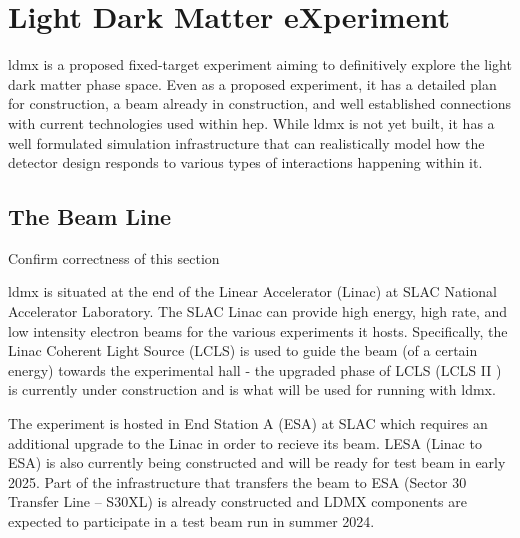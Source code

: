 \chapter{Light Dark Matter eXperiment}
\label{chapter:ldmx:experiment}

\ac{ldmx} is a proposed fixed-target experiment aiming to definitively explore
the light dark matter phase space. Even as a proposed experiment, it has a detailed
plan for construction, a beam already in construction, and well established connections
with current technologies used within \ac{hep}. While \ac{ldmx} is not yet built,
it has a well formulated simulation infrastructure that can realistically model
how the detector design responds to various types of interactions happening within it.

\section{The Beam Line}
\begin{todoenv}
  Confirm correctness of this section
\end{todoenv}
\ac{ldmx} is situated at the end of the Linear Accelerator (Linac) at SLAC National Accelerator
Laboratory. The SLAC Linac can provide high energy, high rate, and low intensity electron beams for
the various experiments it hosts. Specifically, the Linac Coherent Light Source (LCLS) is
used to guide the beam (of a certain energy) towards the experimental hall - the upgraded
phase of LCLS (LCLS II \cite{lcls-ii}) is currently under construction and is what will
be used for running with \ac{ldmx}.

The experiment is hosted in End Station A (ESA) at SLAC which requires an additional upgrade to the
Linac in order to recieve its beam. LESA (Linac to ESA) \cite{lesa-design} is also currently being
constructed and will be ready for test beam in early 2025. Part of the infrastructure that
transfers the beam to ESA (Sector 30 Transfer Line -- S30XL) is already constructed and LDMX
components are expected to participate in a test beam run in summer 2024.

